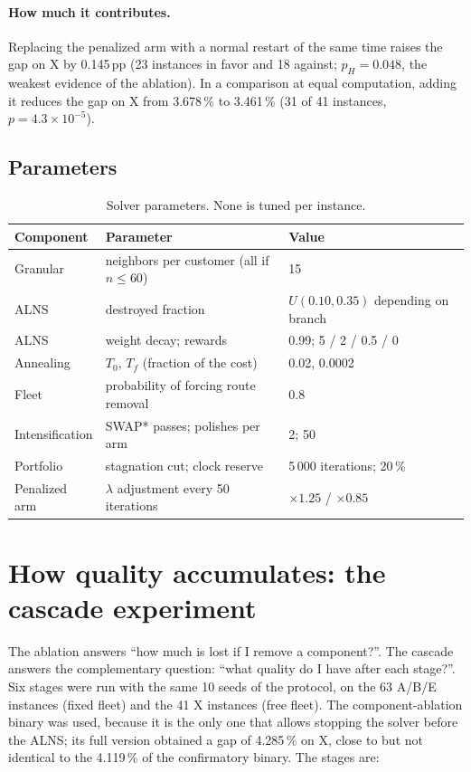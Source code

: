 \documentclass[11pt,a4paper]{article}
\newcommand{\pp}{\,pp}
\begin{document}
\paragraph{How much it contributes.} Replacing the penalized arm with a normal restart of the same
time raises the gap on X by 0.145\pp{} (23 instances in favor and 18 against; $p_H=0.048$, the weakest
evidence of the ablation). In a comparison at equal computation, adding it reduces the gap on X from
3.678\,\% to 3.461\,\% (31 of 41 instances, $p=4.3\times10^{-5}$).

\subsection{Parameters}
\begin{table}[H]
\centering
\caption{Solver parameters. None is tuned per instance.}
\label{tab:parametros}
\small
\begin{tabular}{@{}lll@{}}
\toprule
Component & Parameter & Value \\
\midrule
Granular & neighbors per customer (all if $n\le60$) & 15 \\
ALNS & destroyed fraction & $U(0.10,0.35)$ depending on branch \\
ALNS & weight decay; rewards & 0.99; 5 / 2 / 0.5 / 0 \\
Annealing & $T_0$, $T_f$ (fraction of the cost) & 0.02, 0.0002 \\
Fleet & probability of forcing route removal & 0.8 \\
Intensification & SWAP* passes; polishes per arm & 2; 50 \\
Portfolio & stagnation cut; clock reserve & 5\,000 iterations; 20\,\% \\
Penalized arm & $\lambda$ adjustment every 50 iterations & $\times1.25$ / $\times0.85$ \\
\bottomrule
\end{tabular}
\end{table}

\section{How quality accumulates: the cascade experiment}
\label{sec:cascada}

The ablation answers ``how much is lost if I remove a component?''. The cascade answers the
complementary question: ``what quality do I have after each stage?''. Six stages were run with the
same 10 seeds of the protocol, on the 63 A/B/E instances (fixed fleet) and the 41 X instances (free
fleet). The component-ablation binary was used, because it is the only one that allows stopping the
solver before the ALNS; its full version obtained a gap of 4.285\,\% on X, close to but not identical
to the 4.119\,\% of the confirmatory binary. The stages are:
\end{document}
